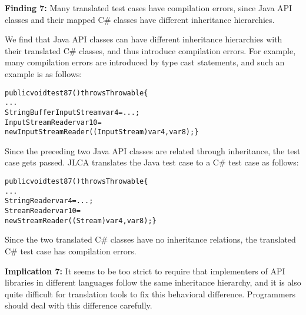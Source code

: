 \textbf{Finding 7:} Many translated test cases have compilation errors, since Java API classes and their mapped C\# classes have different inheritance hierarchies.

We find that Java API classes can have different inheritance hierarchies with their translated C\# classes, and thus introduce compilation errors. For example, many compilation errors are introduced by type cast statements, and such an example is as follows:

\begin{CodeOut}\vspace*{-1ex}
\begin{alltt}
public void test87() throws Throwable\{
  ...
  StringBufferInputStream var4=...;
  InputStreamReader var10=
    new InputStreamReader((InputStream)var4, var8);\}
\end{alltt}
\end{CodeOut}\vspace*{-2ex}

Since the preceding two Java API classes are related through inheritance, the test case gets passed. JLCA translates the Java test case to a C\# test case as follows:

\begin{CodeOut}\vspace*{-1ex}
\begin{alltt}
public void test87() throws Throwable\{
  ...
  StringReader var4=...;
  StreamReader var10=
    new StreamReader((Stream)var4, var8);\}
\end{alltt}
\end{CodeOut}\vspace*{-2ex}

Since the two translated C\# classes have no inheritance relations, the translated C\# test case has compilation errors.

\textbf{Implication 7:} It seems to be too strict to require that implementers of API libraries in different languages follow the same inheritance hierarchy, and it is also quite difficult for translation tools to fix this behavioral difference. Programmers should deal with this difference carefully.



